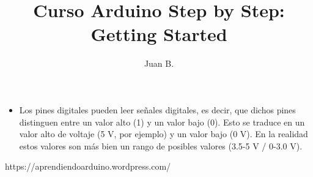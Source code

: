 \documentclass[12pt]{article}
\title{Curso Arduino Step by Step: Getting Started}
\author{Juan B.}
\begin{document}
    

    \begin{itemize}
        \item Los pines digitales pueden leer señales digitales, es decir, que dichos pines distinguen entre un valor alto (1) y un valor bajo (0). Esto se traduce en un valor alto de voltaje (5 V, por ejemplo) y un valor bajo (0 V). En la realidad estos valores son más bien un rango de posibles valores (3.5-5 V / 0-3.0 V).


    \end{itemize}

    https://aprendiendoarduino.wordpress.com/
\end{document}
